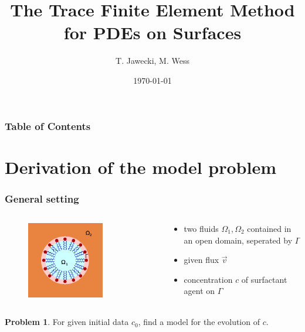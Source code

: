 \documentclass[11pt]{beamer}
\title{\textbf{The Trace Finite Element Method for PDEs on Surfaces}}
\author{T. Jawecki, M. Wess}
\date{\today}
\theoremstyle{plain}
\theoremstyle{definition}
\newtheorem{prob}[thm]{Problem}
\theoremstyle{remark}
\newcommand{\domain}{\Omega}
\newcommand{\boundary}{\Gamma}
\newcommand{\flow}{\vec v}
\begin{document}
\frame{\titlepage}

\begin{frame}
	\frametitle{Table of Contents}
	\tableofcontents
\end{frame}

\section{Derivation of the model problem}
\begin{frame}
    \frametitle{General setting}
    \begin{columns}[T]
    	\begin{column}{0.5\textwidth}
			\begin{figure}[p]
				\includegraphics[width=0.7\textwidth]{surfactant3.png}
			\end{figure}
		\end{column}
		\begin{column}{0.5\textwidth}
			\begin{itemize}
				\pause
				\item{two fluids $\domain_1,\domain_2$ contained in an open domain, seperated by $\boundary$}
				\pause
				\item{given flux $\flow$}
				\pause
				\item{concentration $c$ of surfactant agent on $\boundary$}
			\end{itemize}
		\end{column}
	\end{columns}
	\pause
	\begin{prob}
		For given initial data $c_0$, find a model for the evolution of $c$.
	\end{prob}
\end{frame}
\end{document}

